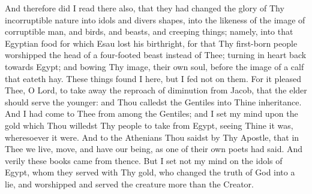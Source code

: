 \documentclass[b5paper,openright,12pt,twoside]{book}
\begin{document}
And therefore did I read there also, that they had changed the glory of
Thy incorruptible nature into idols and divers shapes, into the likeness
of the image of corruptible man, and birds, and beasts, and creeping
things; namely, into that Egyptian food for which Esau lost his
birthright, for that Thy first-born people worshipped the head of a
four-footed beast instead of Thee; turning in heart back towards Egypt;
and bowing Thy image, their own soul, before the image of a calf that
eateth hay. These things found I here, but I fed not on them. For it
pleased Thee, O Lord, to take away the reproach of diminution from
Jacob, that the elder should serve the younger: and Thou calledst the
Gentiles into Thine inheritance. And I had come to Thee from among the
Gentiles; and I set my mind upon the gold which Thou willedst Thy people
to take from Egypt, seeing Thine it was, wheresoever it were. And to the
Athenians Thou saidst by Thy Apostle, that in Thee we live, move, and
have our being, as one of their own poets had said. And verily these
books came from thence. But I set not my mind on the idols of Egypt,
whom they served with Thy gold, who changed the truth of God into a lie,
and worshipped and served the creature more than the Creator.
\end{document}
